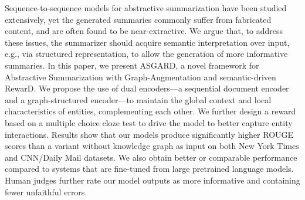 Sequence-to-sequence models for abstractive summarization have been studied extensively, yet the generated summaries commonly suffer from fabricated content, and are often found to be near-extractive. We argue that, to address these issues, the summarizer should acquire semantic interpretation over input, e.g., via structured representation, to allow the generation of more informative summaries. In this paper, we present ASGARD, a novel framework for Abstractive Summarization with Graph-Augmentation and semantic-driven RewarD. We propose the use of dual encoders---a sequential document encoder and a graph-structured encoder---to maintain the global context and local characteristics of entities, complementing each other. We further design a reward based on a multiple choice cloze test to drive the model to better capture entity interactions. Results show that our models produce significantly higher ROUGE scores than a variant without knowledge graph as input on both New York Times and CNN/Daily Mail datasets. We also obtain better or comparable performance compared to systems that are fine-tuned from large pretrained language models. Human judges further rate our model outputs as more informative and containing fewer unfaithful errors.
